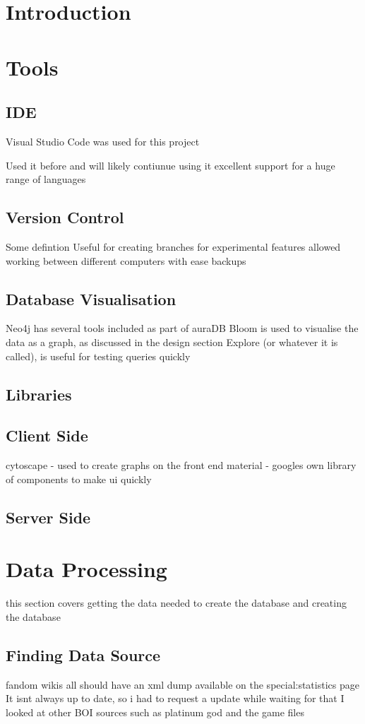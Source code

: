 \section{Introduction}
\section{Tools}
\subsection{IDE}
Visual Studio Code was used for this project 

Used it before and will likely contiunue using it 
excellent support for a huge range of languages

\subsection{Version Control}
Some defintion
Useful for creating branches for experimental features
allowed working between different computers with ease
backups
\subsection{Database Visualisation}
Neo4j has several tools included as part of auraDB
Bloom is used to visualise the data as a graph, as discussed in the design section
Explore (or whatever it is called), is useful for testing queries quickly
\subsection{Libraries}
\subsection{Client Side}
cytoscape - used to create graphs on the front end
material - googles own library of components to make ui quickly
\subsection{Server Side}
\section{Data Processing}
this section covers getting the data needed to create the database and creating the database
\subsection{Finding Data Source}
fandom wikis all should have an xml dump available on the special:statistics page
It isnt always up to date, so i had to request a update
while waiting for that I looked at other BOI sources such as platinum god and the game files

